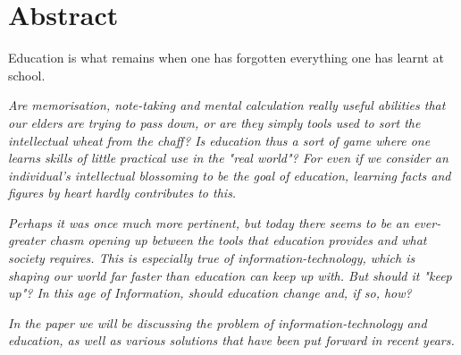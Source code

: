 
\chapter*{Abstract}\label{abstract}

\begin{coolquote}
Education is what remains when one has forgotten everything one has learnt at school.
\end{coolquote}

\textit{Are memorisation, note-taking and mental calculation really useful abilities that our elders are trying to pass down, or are they simply tools used to sort the intellectual wheat from the chaff? Is education thus a sort of game where one learns skills of little practical use in the "real world"? For even if we consider an individual's intellectual blossoming to be the goal of education, learning facts and figures by heart hardly contributes to this.}

\textit{Perhaps it was once much more pertinent, but today there seems to be an ever-greater chasm opening up between the tools that education provides and what society requires. This is especially true of information-technology, which is shaping our world far faster than education can keep up with. But should it "keep up"? In this age of Information, should education change and, if so, how?}

\textit{In the paper we will be discussing the problem of information-technology and education, as well as various solutions that have been put forward in recent years.}